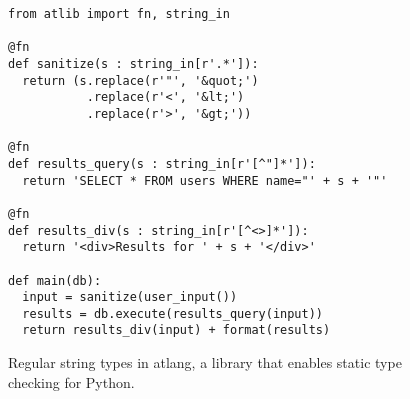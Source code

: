\documentclass[9pt]{sig-alternate}
\theoremstyle{definition}
\begin{document}
\begin{figure}
\begin{lstlisting}
from atlib import fn, string_in

@fn
def sanitize(s : string_in[r'.*']):
  return (s.replace(r'"', '&quot;') 
           .replace(r'<', '&lt;')
           .replace(r'>', '&gt;'))

@fn
def results_query(s : string_in[r'[^"]*']):
  return 'SELECT * FROM users WHERE name="' + s + '"'

@fn
def results_div(s : string_in[r'[^<>]*']):
  return '<div>Results for ' + s + '</div>'

def main(db):
  input = sanitize(user_input())
  results = db.execute(results_query(input))
  return results_div(input) + format(results)
\end{lstlisting}
\vspace{-10px}
\caption{Regular string types in atlang, a library that enables static type checking for Python. }\label{fig:atexample}
\end{figure}
\end{document}
